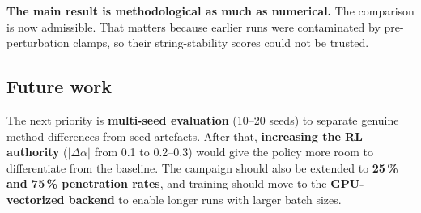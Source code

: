 \textbf{The main result is methodological as much as numerical.} The comparison is now admissible. That matters because earlier runs were contaminated by pre-perturbation clamps, so their string-stability scores could not be trusted.

\subsection{Future work}

The next priority is \textbf{multi-seed evaluation} (10--20 seeds) to separate genuine method differences from seed artefacts. After that, \textbf{increasing the RL authority} ($|\Delta\alpha|$ from 0.1 to 0.2--0.3) would give the policy more room to differentiate from the baseline. The campaign should also be extended to \textbf{25\,\% and 75\,\% penetration rates}, and training should move to the \textbf{GPU-vectorized backend} to enable longer runs with larger batch sizes.
